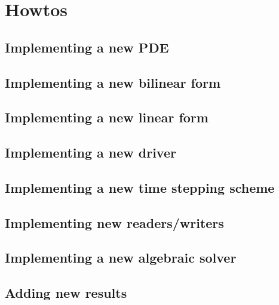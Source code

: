 \chapter{Howtos}

\section{Implementing a new PDE}
\section{Implementing a new bilinear form}
\section{Implementing a new linear form}
\section{Implementing a new driver}
\section{Implementing a new time stepping scheme}
\section{Implementing new readers/writers}
\section{Implementing a new algebraic solver}
\section{Adding new results}
